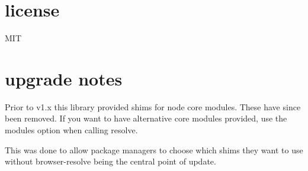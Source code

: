 \section*{license}

M\+IT

\section*{upgrade notes}

Prior to v1.\+x this library provided shims for node core modules. These have since been removed. If you want to have alternative core modules provided, use the {\ttfamily modules} option when calling resolve.

This was done to allow package managers to choose which shims they want to use without browser-\/resolve being the central point of update. 